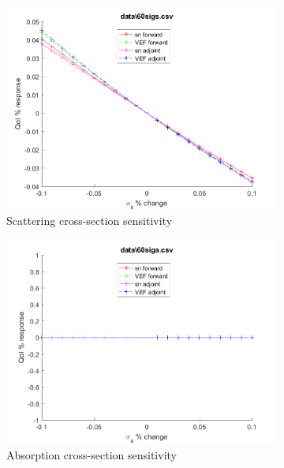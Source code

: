 \documentclass{article}
\begin{document}
\begin{figure}[H]
\begin{subfigure}{.5\textwidth}
  \includegraphics[width=.98\linewidth]{IanProposal/figures2/60sigsSens.png}
  \caption{Scattering cross-section sensitivity}
  \label{fig:sfig2}
\end{subfigure}%
\begin{subfigure}{.5\textwidth}
  \centering
  \includegraphics[width=.98\linewidth]{IanProposal/figures2/60sigaSens.png}
  \caption{Absorption cross-section sensitivity}
  \label{fig:sfig5}
\end{subfigure}%
\caption{}
\label{fig:fig}
\end{figure}
\newpage

\end{document}
